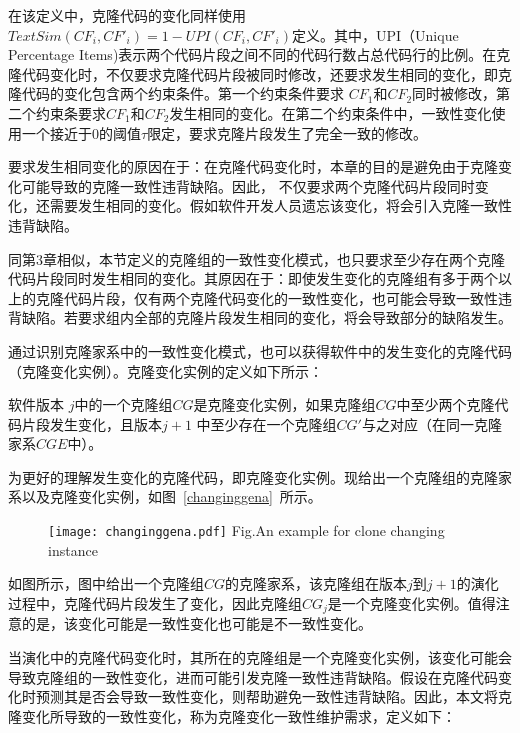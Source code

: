 在该定义中，克隆代码的变化同样使用$\mathit{TextSim}(CF_i, CF'_i)= 1 - \mathit{UPI}(CF_i, CF'_i)$定义。其中，UPI（Unique Percentage Items)表示两个代码片段之间不同的代码行数占总代码行的比例。在克隆代码变化时，不仅要求克隆代码片段被同时修改，还要求发生相同的变化，即克隆代码的变化包含两个约束条件。第一个约束条件要求 $CF_1 $和$CF_2 $同时被修改，第二个约束条要求$CF_1 $和$CF_2$发生相同的变化。在第二个约束条件中，一致性变化使用一个接近于0的阈值$\tau$限定，要求克隆片段发生了完全一致的修改。%

要求发生相同变化的原因在于：在克隆代码变化时，本章的目的是避免由于克隆变化可能导致的克隆一致性违背缺陷。因此， 不仅要求两个克隆代码片段同时变化，还需要发生相同的变化。假如软件开发人员遗忘该变化，将会引入克隆一致性违背缺陷。

同第3章相似，本节定义的克隆组的一致性变化模式，也只要求至少存在两个克隆代码片段同时发生相同的变化。其原因在于：即使发生变化的克隆组有多于两个以上的克隆代码片段，仅有两个克隆代码变化的一致性变化，也可能会导致一致性违背缺陷。若要求组内全部的克隆片段发生相同的变化，将会导致部分的缺陷发生。

通过识别克隆家系中的一致性变化模式，也可以获得软件中的发生变化的克隆代码（克隆变化实例）。克隆变化实例的定义如下所示：

\begin{definition}[克隆变化实例] 
\label{def-changinginstance}
软件版本 $j$中的一个克隆组$CG$是克隆变化实例，如果克隆组$CG$中至少两个克隆代码片段发生变化，且版本$j+1$ 中至少存在一个克隆组$CG'$与之对应（在同一克隆家系$CGE$中）。 
\end{definition}

为更好的理解发生变化的克隆代码，即克隆变化实例。现给出一个克隆组的克隆家系以及克隆变化实例，如图~\ref{changinggena}~所示。

\begin{figure}[htbp]
\centering
\texttt{[image: changinggena.pdf]}
{Fig.$\!$}{An example for clone changing instance}
\vspace{-1em}
\end{figure}

如图所示，图中给出一个克隆组$CG$的克隆家系，该克隆组在版本$j$到$j+1$的演化过程中，克隆代码片段发生了变化，因此克隆组$CG_j$是一个克隆变化实例。值得注意的是，该变化可能是一致性变化也可能是不一致性变化。

当演化中的克隆代码变化时，其所在的克隆组是一个克隆变化实例，该变化可能会导致克隆组的一致性变化，进而可能引发克隆一致性违背缺陷。假设在克隆代码变化时预测其是否会导致一致性变化，则帮助避免一致性违背缺陷。因此，本文将克隆变化所导致的一致性变化，称为克隆变化一致性维护需求，定义如下：

